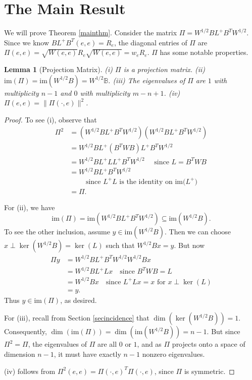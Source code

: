 \documentclass[11pt]{article}
\newtheorem{lem}{Lemma}
\newcommand{\cross}{+}
\newcommand{\im}{\mathrm{im}}
\begin{document}
\section{The Main Result}
We will prove Theorem \ref{mainthm}. Consider the matrix $\Pi = W^{1/2}BL^\cross B^TW^{1/2}$. Since we know
$BL^+B^T(e,e)=R_e$, the diagonal entries of $\Pi$ are
$\Pi(e,e)=\sqrt{W(e,e)}R_e\sqrt{W(e,e)}=w_eR_e$. $\Pi$ has some notable properties.
\begin{lem}[Projection Matrix]\label{lempi} (i) $\Pi$ is a projection matrix. (ii)
$\im(\Pi)=\im(W^{1/2}B)=W^{1/2}\mathbb{B}$. 
(iii) The eigenvalues of
$\Pi$ are $1$ with multiplicity $n-1$ and $0$ with multiplicity $m-n+1$. 
(iv) $\Pi(e,e)=\|\Pi(\cdot,e)\|^2$. 

\end{lem}
\begin{proof} To see (i), observe that 
\begin{align*}
 \Pi^2 &= (W^{1/2}BL^\cross B^TW^{1/2})(W^{1/2}BL^\cross B^TW^{1/2})
 \\&= W^{1/2}BL^\cross (B^TWB)L^\cross B^TW^{1/2}
 \\&= W^{1/2}BL^\cross LL^\cross B^TW^{1/2} \quad\textrm{ since $L=B^TWB$}
 \\&=W^{1/2}BL^\cross B^TW^{1/2}\\
 &\qquad\textrm{ since $L^\cross L$ is the identity
 on $\im(L^\cross$)} 
 \\&=\Pi. \end{align*} 

For (ii), we have
\[\im(\Pi)=\im(W^{1/2}BL^\cross B^TW^{1/2})\subseteq \im(W^{1/2}B).\]
To see the other inclusion, assume $y\in\im(W^{1/2}B)$. Then we can choose
$x\perp\ker(W^{1/2}B)=\ker(L)$ such that $W^{1/2}Bx=y$. But now
\begin{align*}
\Pi y &= W^{1/2}BL^\cross B^TW^{1/2}W^{1/2}Bx
\\&= W^{1/2}BL^\cross Lx\quad\textrm{since $B^TWB=L$}
\\&= W^{1/2}B x\quad\textrm{since $L^\cross Lx=x$ for $x\perp\ker(L)$}
\\&= y.\end{align*}
Thus $y\in\im(\Pi)$, as desired.

For (iii), recall from Section \ref{secincidence} that
$\dim(\ker(W^{1/2}B))=1$. Consequently, $\dim(\im(\Pi))=\dim(\im(W^{1/2}B))=n-1$.
But since $\Pi^2=\Pi$, the eigenvalues of $\Pi$ are all $0$ or $1$, and as $\Pi $
projects onto a space of dimension $n-1$, it must have exactly $n-1$ nonzero
eigenvalues.

(iv) follows from $\Pi^2(e,e)=\Pi(\cdot,e)^T\Pi(\cdot,e)$, since $\Pi$
is symmetric.
\end{proof}
\end{document}
